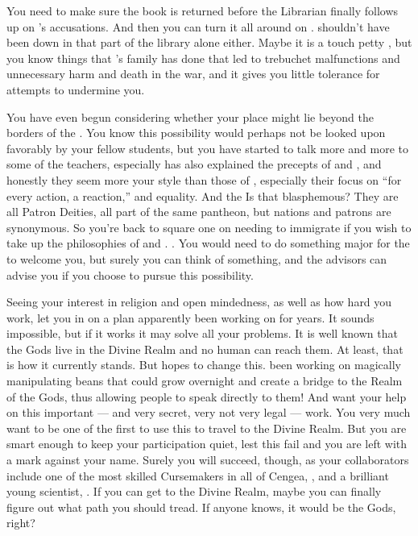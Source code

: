 \documentclass[char]{GL2020}
\begin{document}
You need to make sure the book is returned before the Librarian finally follows up on \cLibAssist{}’s accusations. And then you can turn it all around on \cLibAssist{}. \cLibAssist{\They} shouldn’t have been down in that part of the library alone either. Maybe it is a touch petty , but you know things that \cLibAssist{}’s family has done that led to trebuchet malfunctions and unnecessary harm and death in the war, and it gives you little tolerance for \cLibAssist{\their} attempts to undermine you. 

You have even begun considering whether your place might lie beyond the borders of the \pTech{}. You know this possibility would perhaps not be looked upon favorably by your fellow \pTech{} students, but you have started to talk more and more to some of the \pShip{} teachers, especially \cFlowPriest{} has also explained the precepts of \cEbb{} and \cFlow{}, and honestly they seem more your style than those of \cTechGod{}, especially their focus on “for every action, a reaction,” and equality. And the  Is that blasphemous? They are all Patron Deities, all part of the same pantheon, but nations and patrons are synonymous. So you’re back to square one on needing to immigrate if you wish to take up the philosophies of \cEbb{} and \cFlow{}. . You would need to do something major for the \pShippies{} to welcome you, but surely you can think of something, and the \pShippie{} advisors can advise you if you choose to pursue this possibility.


Seeing your interest in \cFlowPriest{\their} religion and open mindedness, as well as how hard you work, \cFlowPriest{\they} let you in on a plan  apparently been working on for years. It sounds impossible, but if it works it may solve all your problems. It is well known that the Gods live in the Divine Realm and no human can reach them. At least, that is how it currently stands. But \cFlowPriest{} hopes to change this. \cFlowPriest{\They \have} been working on magically manipulating beans that could grow overnight and create a bridge to the Realm of the Gods, thus allowing people to speak directly to them! And \cFlowPriest{\they} want\cFlowPriest{\verbs} your help on this important — and very secret, very not very legal — work. You very much want to be one of the first to use this to travel to the Divine Realm. But you are smart enough to keep your participation quiet, lest this fail and you are left with a mark against your name. Surely you will succeed, though, as your collaborators include one of the most skilled Cursemakers in all of Cengea, \cCurse{\full}, and a brilliant young \pTech{} scientist, \cAssistantScientist{\full}. If you can get to the Divine Realm, maybe you can finally figure out what path you should tread. If anyone knows, it would be the Gods, right? 
\end{document}
